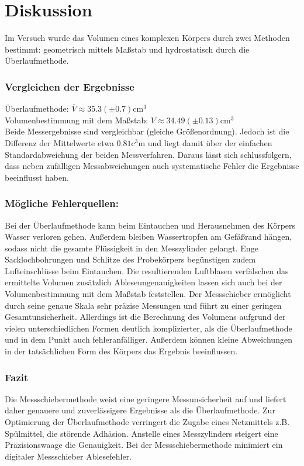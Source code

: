 \section{Diskussion}
\label{sec:Diskussion}

Im Versuch wurde das Volumen eines komplexen Körpers durch zwei Methoden bestimmt: geometrisch mittels Maßstab und hydrostatisch durch die Überlaufmethode.\\

\subsubsection*{Vergleichen der Ergebnisse}
Überlaufmethode: $\overline{V} \approx 35.3(\pm 0.7) \unit{\centi\meter\cubed}$\\
Volumenbestimmung mit dem Maßstab: ${V} \approx 34.49(\pm 0.13) \unit{\centi\meter\cubed}$\\
Beide Messergebnisse sind vergleichbar (gleiche Größenordnung). Jedoch ist die Differenz der Mittelwerte etwa $0.81 \unit{\cubic\centi\meter}$ und liegt damit über der einfachen Standardabweichung der beiden Messverfahren. 
Daraus lässt sich schlussfolgern, dass neben zufälligen Messabweichungen auch systematische Fehler die Ergebnisse beeinflusst haben.\\

\subsubsection*{Mögliche Fehlerquellen:}
Bei der Überlaufmethode kann beim Eintauchen und Herausnehmen des Körpers Wasser verloren gehen. Außerdem bleiben Wassertropfen am Gefäßrand hängen, sodass nicht die gesamte Flüssigkeit in den Messzylinder gelangt. Enge Sacklochbohrungen und Schlitze des Probekörpers begünstigen zudem Lufteinschlüsse beim Eintauchen. Die resultierenden Luftblasen verfälschen das ermittelte Volumen zusätzlich
Ableseungenauigkeiten lassen sich auch bei der Volumenbestimmung mit dem Maßstab feststellen. Der Messschieber ermöglicht durch seine genaue Skala sehr präzise Messungen und führt zu einer geringen Gesamtunsicherheit. Allerdings ist die Berechnung des Volumens aufgrund der vielen unterschiedlichen Formen deutlich komplizierter, als die Überlaufmethode und in dem Punkt auch fehleranfälliger. Außerdem können kleine Abweichungen in der tatsächlichen Form des Körpers das Ergebnis beeinflussen.\\

\subsubsection*{Fazit}
Die Messschiebermethode weist eine geringere Messunsicherheit auf und liefert daher genauere und zuverlässigere Ergebnisse als die Überlaufmethode.
Zur Optimierung der Überlaufmethode verringert die Zugabe eines Netzmittels z.B. Spülmittel, die störende Adhäsion. Anstelle eines Messzylinders steigert eine Präzisionswaage die Genauigkeit. Bei der Messschiebermethode minimiert ein digitaler Messschieber Ablesefehler.\\
